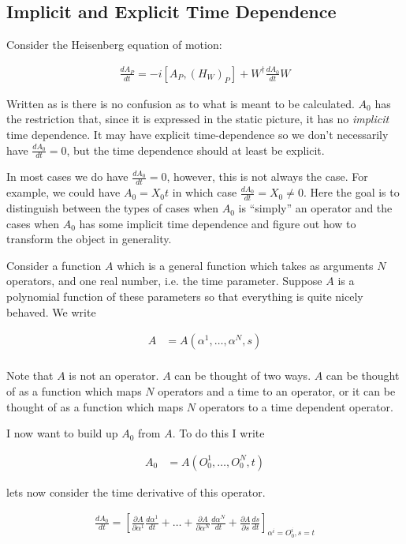 \documentclass[12pt]{article}
\newcommand{\ddt}[1]{\frac{d #1}{dt}}
\begin{document}
\subsection{Implicit and Explicit Time Dependence}

Consider the Heisenberg equation of motion:

\begin{align}
\ddt{A_P} = -i[A_P,(H_W)_P] + W^{\dag}\ddt{A_0}W
\end{align}

Written as is there is no confusion as to what is meant to be calculated. $A_0$ has the restriction that, since it is expressed in the static picture, it has no \textit{implicit} time dependence. It may have explicit time-dependence so we don't necessarily have $\ddt{A_0} = 0$, but the time dependence should at least be explicit.

In most cases we do have $\ddt{A_0} = 0$, however, this is not always the case. For example, we could have $A_0 = X_0 t$ in which case $\ddt{A_0} = X_0 \neq 0$. Here the goal is to distinguish between the types of cases when $A_0$ is ``simply'' an operator and the cases when $A_0$ has some implicit time dependence and figure out how to transform the object in generality.

Consider a function $A$ which is a general function which takes as arguments $N$ operators, and one real number, i.e. the time parameter. Suppose $A$ is a polynomial function of these parameters so that everything is quite nicely behaved.
We write

\begin{align}
A &= A\left(\alpha^1,\ldots,\alpha^N,s\right)\\
\end{align}

Note that $A$ is not an operator. $A$ can be thought of two ways. $A$ can be thought of as a function which maps $N$ operators and a time to an operator, or it can be thought of as a function which maps $N$ operators to a time dependent operator.

I now want to build up $A_0$ from $A$. To do this I write

\begin{align}
A_0 &= A\left(O^1_0,\ldots,O^N_0,t \right)
\end{align}

lets now consider the time derivative of this operator.

\begin{align}
\ddt{A_0} = \left[\frac{\partial A}{\partial \alpha^1} \ddt{\alpha^1}+\ldots+\frac{\partial A}{\partial \alpha^N} \ddt{\alpha^N} + \frac{\partial{A}}{\partial s}\ddt{s}\right]_{\alpha^i = O^i_0,s = t}
\end{align}
\end{document}
